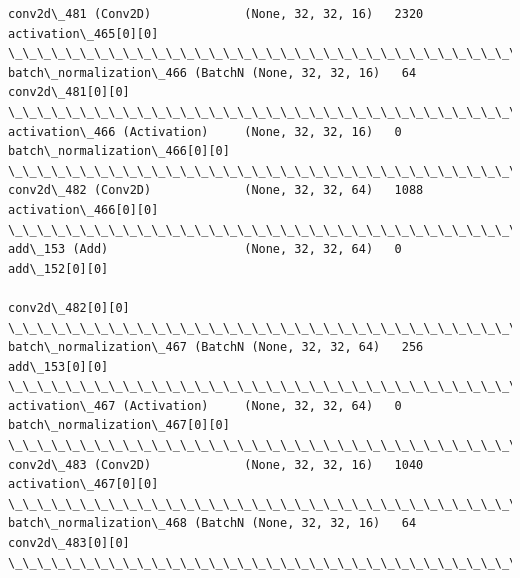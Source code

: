 \documentclass[11pt]{article}
\begin{document}
\begin{Verbatim}[commandchars=\\\{\}]
conv2d\_481 (Conv2D)             (None, 32, 32, 16)   2320        activation\_465[0][0]             
\_\_\_\_\_\_\_\_\_\_\_\_\_\_\_\_\_\_\_\_\_\_\_\_\_\_\_\_\_\_\_\_\_\_\_\_\_\_\_\_\_\_\_\_\_\_\_\_\_\_\_\_\_\_\_\_\_\_\_\_\_\_\_\_\_\_\_\_\_\_\_\_\_\_\_\_\_\_\_\_\_\_\_\_\_\_\_\_\_\_\_\_\_\_\_\_\_\_
batch\_normalization\_466 (BatchN (None, 32, 32, 16)   64          conv2d\_481[0][0]                 
\_\_\_\_\_\_\_\_\_\_\_\_\_\_\_\_\_\_\_\_\_\_\_\_\_\_\_\_\_\_\_\_\_\_\_\_\_\_\_\_\_\_\_\_\_\_\_\_\_\_\_\_\_\_\_\_\_\_\_\_\_\_\_\_\_\_\_\_\_\_\_\_\_\_\_\_\_\_\_\_\_\_\_\_\_\_\_\_\_\_\_\_\_\_\_\_\_\_
activation\_466 (Activation)     (None, 32, 32, 16)   0           batch\_normalization\_466[0][0]    
\_\_\_\_\_\_\_\_\_\_\_\_\_\_\_\_\_\_\_\_\_\_\_\_\_\_\_\_\_\_\_\_\_\_\_\_\_\_\_\_\_\_\_\_\_\_\_\_\_\_\_\_\_\_\_\_\_\_\_\_\_\_\_\_\_\_\_\_\_\_\_\_\_\_\_\_\_\_\_\_\_\_\_\_\_\_\_\_\_\_\_\_\_\_\_\_\_\_
conv2d\_482 (Conv2D)             (None, 32, 32, 64)   1088        activation\_466[0][0]             
\_\_\_\_\_\_\_\_\_\_\_\_\_\_\_\_\_\_\_\_\_\_\_\_\_\_\_\_\_\_\_\_\_\_\_\_\_\_\_\_\_\_\_\_\_\_\_\_\_\_\_\_\_\_\_\_\_\_\_\_\_\_\_\_\_\_\_\_\_\_\_\_\_\_\_\_\_\_\_\_\_\_\_\_\_\_\_\_\_\_\_\_\_\_\_\_\_\_
add\_153 (Add)                   (None, 32, 32, 64)   0           add\_152[0][0]                    
                                                                 conv2d\_482[0][0]                 
\_\_\_\_\_\_\_\_\_\_\_\_\_\_\_\_\_\_\_\_\_\_\_\_\_\_\_\_\_\_\_\_\_\_\_\_\_\_\_\_\_\_\_\_\_\_\_\_\_\_\_\_\_\_\_\_\_\_\_\_\_\_\_\_\_\_\_\_\_\_\_\_\_\_\_\_\_\_\_\_\_\_\_\_\_\_\_\_\_\_\_\_\_\_\_\_\_\_
batch\_normalization\_467 (BatchN (None, 32, 32, 64)   256         add\_153[0][0]                    
\_\_\_\_\_\_\_\_\_\_\_\_\_\_\_\_\_\_\_\_\_\_\_\_\_\_\_\_\_\_\_\_\_\_\_\_\_\_\_\_\_\_\_\_\_\_\_\_\_\_\_\_\_\_\_\_\_\_\_\_\_\_\_\_\_\_\_\_\_\_\_\_\_\_\_\_\_\_\_\_\_\_\_\_\_\_\_\_\_\_\_\_\_\_\_\_\_\_
activation\_467 (Activation)     (None, 32, 32, 64)   0           batch\_normalization\_467[0][0]    
\_\_\_\_\_\_\_\_\_\_\_\_\_\_\_\_\_\_\_\_\_\_\_\_\_\_\_\_\_\_\_\_\_\_\_\_\_\_\_\_\_\_\_\_\_\_\_\_\_\_\_\_\_\_\_\_\_\_\_\_\_\_\_\_\_\_\_\_\_\_\_\_\_\_\_\_\_\_\_\_\_\_\_\_\_\_\_\_\_\_\_\_\_\_\_\_\_\_
conv2d\_483 (Conv2D)             (None, 32, 32, 16)   1040        activation\_467[0][0]             
\_\_\_\_\_\_\_\_\_\_\_\_\_\_\_\_\_\_\_\_\_\_\_\_\_\_\_\_\_\_\_\_\_\_\_\_\_\_\_\_\_\_\_\_\_\_\_\_\_\_\_\_\_\_\_\_\_\_\_\_\_\_\_\_\_\_\_\_\_\_\_\_\_\_\_\_\_\_\_\_\_\_\_\_\_\_\_\_\_\_\_\_\_\_\_\_\_\_
batch\_normalization\_468 (BatchN (None, 32, 32, 16)   64          conv2d\_483[0][0]                 
\_\_\_\_\_\_\_\_\_\_\_\_\_\_\_\_\_\_\_\_\_\_\_\_\_\_\_\_\_\_\_\_\_\_\_\_\_\_\_\_\_\_\_\_\_\_\_\_\_\_\_\_\_\_\_\_\_\_\_\_\_\_\_\_\_\_\_\_\_\_\_\_\_\_\_\_\_\_\_\_\_\_\_\_\_\_\_\_\_\_\_\_\_\_\_\_\_\_

\end{Verbatim}
\end{document}
